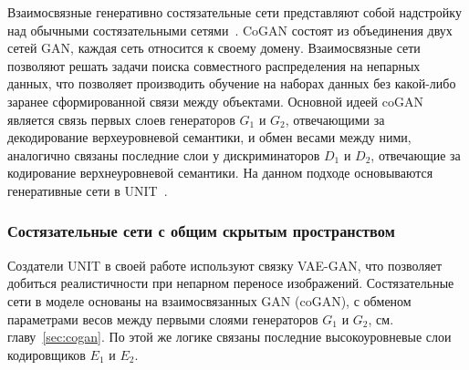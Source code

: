 \documentclass[11pt,a4paper]{extarticle}
\begin{document}
			Взаимосвязные генеративно состязательные сети представляют собой надстройку над обычными состязательными сетями~\cite{coGAN}.
			CoGAN состоят из объединения двух сетей GAN, каждая сеть относится к своему домену.
			Взаимосвязные сети позволяют решать задачи поиска совместного распределения на непарных данных,
			что позволяет производить обучение на наборах данных без какой-либо заранее сформированной связи между объектами.
			Основной идеей coGAN является связь первых слоев генераторов \(G_1\) и \(G_2\), отвечающими за декодирование верхеуровневой семантики, и обмен весами между ними,
			аналогично связаны последние слои у дискриминаторов \(D_1\) и \(D_2\), отвечающие за кодирование верхнеуровневой семантики. 
			На данном подходе основываются генеративные сети в UNIT~\cite{UNIT}. 

		\subsubsection{Состязательные сети с общим скрытым пространством}\label{sec:latent}

			Создатели UNIT в своей работе используют связку VAE-GAN, что позволяет добиться реалистичности при непарном переносе изображений.
			Состязательные сети в моделе основаны на взаимосвязанных GAN (coGAN), с обменом параметрами весов между первыми слоями генераторов \(G_1\) и \(G_2\), см. главу~\ref{sec:cogan}.
			По этой же логике связаны последние высокоуровневые слои кодировщиков \(E_1\) и \(E_2\). 
			
\end{document}
